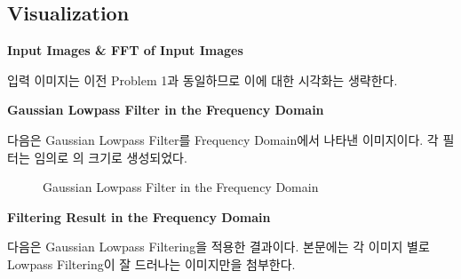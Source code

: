 \documentclass{report}
\begin{document}
\subsection*{Visualization}

\noindent\textbf{Input Images \& FFT of Input Images}

입력 이미지는 이전 Problem 1과 동일하므로 이에 대한 시각화는 생략한다.

\noindent\textbf{Gaussian Lowpass Filter in the Frequency Domain}

다음은 Gaussian Lowpass Filter를 Frequency Domain에서 나타낸 이미지이다.
각 필터는 임의로 의 크기로 생성되었다.

\begin{figure}[htbp]
    \centering

    \hspace{1pt}
    \hspace{1pt}

    \caption{Gaussian Lowpass Filter in the Frequency Domain}
\end{figure}

\noindent\textbf{Filtering Result in the Frequency Domain}

다음은 Gaussian Lowpass Filtering을 적용한 결과이다.
본문에는 각 이미지 별로 Lowpass Filtering이 잘 드러나는 이미지만을 첨부한다.
\end{document}

